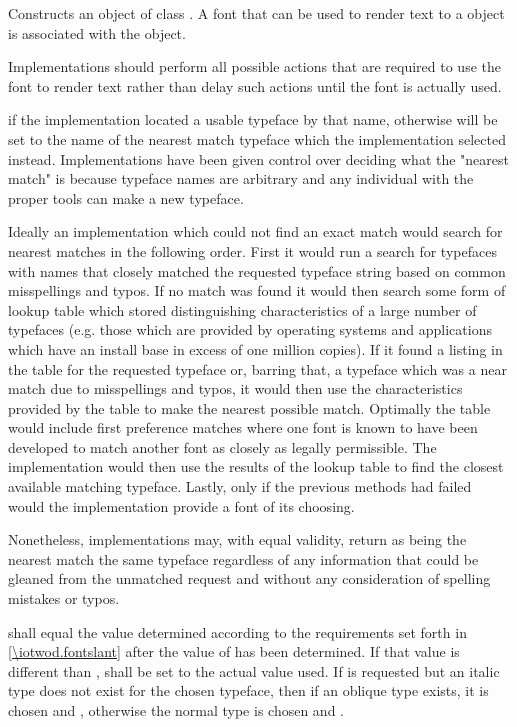 \begin{itemdescr}
	\pnum
	\effects
	Constructs an object of class . A font that can be used to render text to a  object is associated with the object.
	
	\pnum
	Implementations should perform all possible actions that are required to use the font to render text rather than delay such actions until the font is actually used.
	
	\pnum
	\postconditions
	 if the implementation located a usable typeface by that name, otherwise  will be set to the name of the  nearest match typeface which the implementation selected instead.
	\enternote
	Implementations have been given control over deciding what the "nearest match" is because typeface names are arbitrary and any individual with the proper tools can make a new typeface.
	
	Ideally an implementation which could not find an exact match would search for nearest matches in the following order. First it would run a search for typefaces with names that closely matched the requested typeface string based on common misspellings and typos. If no match was found it would then search some form of lookup table which stored distinguishing characteristics of a large number of typefaces (e.g. those which are provided by operating systems and applications which have an install base in excess of one million copies). If it found a listing in the table for the requested typeface or, barring that, a typeface which was a near match due to misspellings and typos, it would then use the characteristics provided by the table to make the nearest possible match. Optimally the table would include first preference matches where one font is known to have been developed to match another font as closely as legally permissible. The implementation would then use the results of the lookup table to find the closest available matching typeface. Lastly, only if the previous methods had failed would the implementation provide a font of its choosing.
	
	Nonetheless, implementations may, with equal validity, return as being the nearest match the same typeface regardless of any information that could be gleaned from the unmatched request and without any consideration of spelling mistakes or typos.
	\exitnote
	
	\pnum
	 shall equal the value determined according to the requirements set forth in \ref{\iotwod.fontslant} after the value of  has been determined. If that  value is different than ,  shall be set to the actual value used.
	\enterexample
	If  is requested but an italic type does not exist for the chosen typeface, then if an oblique type exists, it is chosen and , otherwise the normal type is chosen and .
	\exitexample
	

\end{itemdescr}
